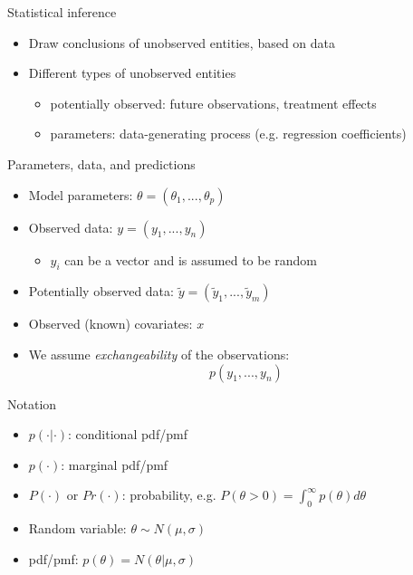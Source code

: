 \documentclass[10pt]{beamer}
\begin{document}
\begin{frame}{Statistical inference}
  \begin{itemize}
  \item Draw conclusions of {\color{uured} unobserved} entities, based on {\color{uured} data} \pause
  \item Different types of unobserved entities
    \begin{itemize}
    \item {\color{uured} potentially observed}: future observations, treatment effects
    \item {\color{uured} parameters}: data-generating process (e.g. regression coefficients)
    \end{itemize}
  \end{itemize}
\end{frame}

\begin{frame}{Parameters, data, and predictions}

  \begin{itemize}
  \item Model parameters: $\theta = (\theta_1,...,\theta_p)$
  \item Observed data: $y = (y_1,...,y_n)$
    \begin{itemize}
    \item $y_i$ can be a vector and is assumed to be random
    \end{itemize}
  \item Potentially observed data: $\tilde{y} = (\tilde{y}_1,...,\tilde{y}_m)$
  \item Observed (known) covariates: $x$
  \item We assume \emph{exchangeability} of the observations:
\[
p(y_1,...,y_n)
\]
  \end{itemize}
\end{frame}

\begin{frame}{Notation}

  \begin{itemize}
    \item $p(\cdot|\cdot)$: conditional pdf/pmf
    \item $p(\cdot)$: marginal pdf/pmf
    \item $P(\cdot)$ or $Pr(\cdot)$: probability, e.g. $P(\theta > 0) = \int_0^\infty p(\theta) d\theta$
    \item Random variable: $\theta \sim N(\mu,\sigma)$
    \item pdf/pmf: $p(\theta) = N(\theta | \mu,\sigma)$
  \end{itemize}

\end{frame}
\end{document}
